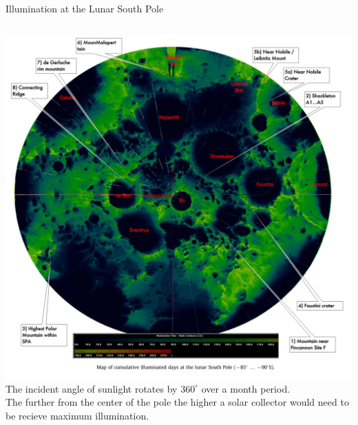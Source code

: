 \documentclass{beamer}
\begin{document}
\begin{frame}{Illumination at the Lunar South Pole}
       \begin{columns}
             \centering
             \includegraphics[width= \textwidth]{South_Pole_Light.jpg}
            The incident angle of sunlight rotates by $360^{\circ}$ over a month period.\\
            The further from the center of the pole the higher a solar collector would need to be recieve maximum illumination.  \cite{Koebel}
         \end{columns} 
    \end{frame}
\end{document}
